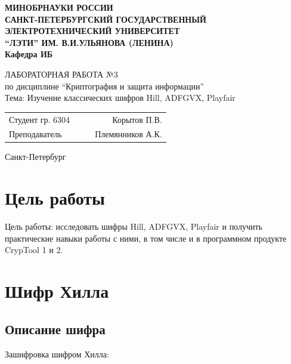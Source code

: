 \documentclass[a4paper, 14pt]{extarticle}
\begin{document}
\begin{titlepage}
    \centering
    {\bfseries
        \uppercase{
            Минобрнауки России \\
            Санкт-Петербургский государственный \\
            Электротехнический университет \\
            \enquote{ЛЭТИ} им. В.И.Ульянова (Ленина)\\
        }
        Кафедра ИБ

        \vspace{\fill}
        \uppercase{Лабораторная работа №3} \\
        по дисциплине \enquote{Криптография и защита информации} \\
        Тема: Изучение классических шифров Hill, ADFGVX, Playfair
    }

    \vspace{\fill}
    \begin{tabularx}{0.8\textwidth}{l X c r}
        Студент гр. 6304 & & \underline{\hspace{3cm}} & Корытов П.В.\\
        Преподаватель & & \underline{\hspace{3cm}} & Племянников А.К.
    \end{tabularx}

    \vspace{1cm}
    Санкт-Петербург \\
    \the\year{}
\end{titlepage}

\newpage

\section*{Цель работы}
Цель работы: исследовать шифры Hill, ADFGVX, Playfair и получить практические навыки работы с ними, в том числе и в программном продукте CrypTool 1 и 2.

\section{Шифр Хилла}
\subsection{Описание шифра}
Зашифровка шифром Хилла:
\end{document}
